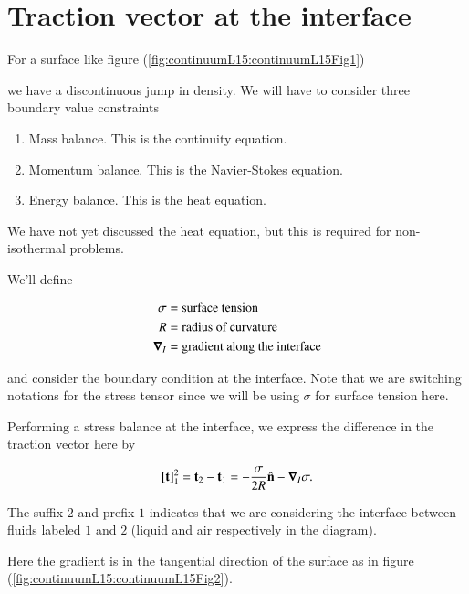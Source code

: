 \section{Traction vector at the interface}

For a surface like figure (\ref{fig:continuumL15:continuumL15Fig1})

we have a discontinuous jump in density.  We will have to consider three boundary value constraints

\begin{enumerate}
\item Mass balance.  This is the continuity equation.
\item Momentum balance.  This is the Navier-Stokes equation.
\item Energy balance.  This is the heat equation.
\end{enumerate}

We have not yet discussed the heat equation, but this is required for non-isothermal problems.

We'll define

\begin{align}\label{eqn:continuumL14:150}
\sigma &= \text{surface tension} \\
R &= \text{radius of curvature} \\
\boldsymbol{\nabla}_I &= \text{gradient along the interface}
\end{align}

and consider the boundary condition at the interface.  Note that we are switching notations for the stress tensor since we will be using $\sigma$ for surface tension here.

Performing a stress balance at the interface, we express the difference in the traction vector here by

\begin{equation}\label{eqn:continuumL15:130}
[\mathbf{t}]_1^2 = \mathbf{t}_2 - \mathbf{t}_1 = -\frac{\sigma}{2 R} \hat{\mathbf{n}} - \boldsymbol{\nabla}_I \sigma.
\end{equation}

The suffix $2$ and prefix $1$ indicates that we are considering the interface between fluids labeled $1$ and $2$ (liquid and air respectively in the diagram).

Here the gradient is in the tangential direction of the surface as in figure (\ref{fig:continuumL15:continuumL15Fig2}).


